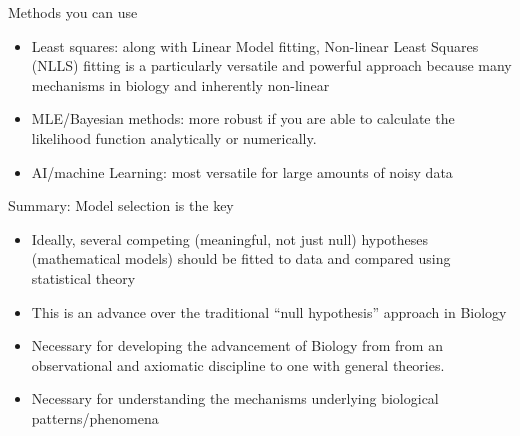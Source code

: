 \documentclass[xcolor=x11names,compress]{beamer}
\renewcommand{\(}{\begin{columns}}
\renewcommand{\)}{\end{columns}}
\newcommand{\<}[1]{\begin{column}{#1}}
\renewcommand{\>}{\end{column}}
\begin{document}
\begin{frame}{Methods you can use}

\begin{itemize} \itemsep12pt
	
\item Least squares: along with Linear Model fitting, Non-linear Least Squares (NLLS) fitting is a particularly versatile and powerful approach because many mechanisms in biology and inherently non-linear

\item MLE/Bayesian methods: more robust if you are able to calculate the likelihood function analytically or numerically. 

\item AI/machine Learning: most versatile for large amounts of noisy data

\end{itemize}

\end{frame}


\begin{frame}{Summary: Model selection is the key}

\begin{itemize}[<+->]\itemsep12pt
	\item Ideally, several competing (meaningful, not just null) hypotheses (mathematical models) should be fitted to data and compared using statistical theory 
	\item This is an advance over the traditional ``null hypothesis'' approach in Biology
	\item Necessary for developing the advancement of Biology from from an observational and axiomatic discipline to one with general theories.
	\item Necessary for understanding the mechanisms underlying biological patterns/phenomena
\end{itemize}
 
 \end{frame}

\end{document}
